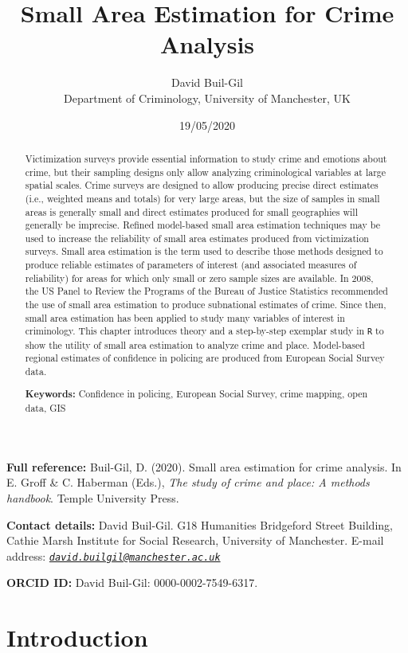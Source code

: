 \documentclass[
]{article}
\title{Small Area Estimation for Crime Analysis}
\author{David Buil-Gil\\
Department of Criminology, University of Manchester, UK}
\date{19/05/2020}
\begin{document}
\maketitle
\begin{abstract}
Victimization surveys provide essential information to study crime and
emotions about crime, but their sampling designs only allow analyzing
criminological variables at large spatial scales. Crime surveys are
designed to allow producing precise direct estimates (i.e., weighted
means and totals) for very large areas, but the size of samples in small
areas is generally small and direct estimates produced for small
geographies will generally be imprecise. Refined model-based small area
estimation techniques may be used to increase the reliability of small
area estimates produced from victimization surveys. Small area
estimation is the term used to describe those methods designed to
produce reliable estimates of parameters of interest (and associated
measures of reliability) for areas for which only small or zero sample
sizes are available. In 2008, the US Panel to Review the Programs of the
Bureau of Justice Statistics recommended the use of small area
estimation to produce subnational estimates of crime. Since then, small
area estimation has been applied to study many variables of interest in
criminology. This chapter introduces theory and a step-by-step exemplar
study in \texttt{R} to show the utility of small area estimation to
analyze crime and place. Model-based regional estimates of confidence in
policing are produced from European Social Survey data.

\par

\textbf{Keywords:} Confidence in policing, European Social Survey, crime
mapping, open data, GIS
\end{abstract}

\textbf{Full reference:} Buil-Gil, D. (2020). Small area estimation for
crime analysis. In E. Groff \& C. Haberman (Eds.), \emph{The study of
crime and place: A methods handbook}. Temple University Press.

\textbf{Contact details:} David Buil-Gil. G18 Humanities Bridgeford
Street Building, Cathie Marsh Institute for Social Research, University
of Manchester. E-mail address:
\emph{\href{mailto:david.builgil@manchester.ac.uk}{\nolinkurl{david.builgil@manchester.ac.uk}}}

\textbf{ORCID ID:} David Buil-Gil: 0000-0002-7549-6317.

\hypertarget{introduction}{%
\section{Introduction}\label{introduction}}
\end{document}

